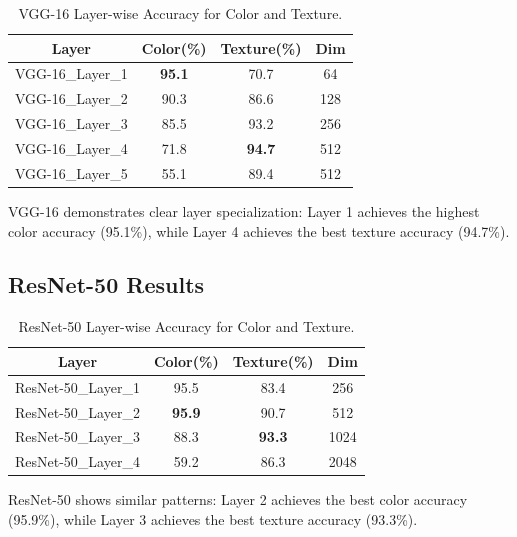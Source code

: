 \documentclass[conference]{IEEEtran}
\begin{document}
\begin{table}[htbp]
\caption{VGG-16 Layer-wise Accuracy for Color and Texture.}
\begin{center}
\begin{tabular}{|c|c|c|c|}
\hline
\textbf{Layer} & \textbf{Color(\%)} & \textbf{Texture(\%)} & \textbf{Dim}\\
\hline
VGG-16\_Layer\_1 & \textbf{95.1} & 70.7 & 64 \\
\hline
VGG-16\_Layer\_2 & 90.3 & 86.6 & 128 \\
\hline
VGG-16\_Layer\_3 & 85.5 & 93.2 & 256 \\
\hline
VGG-16\_Layer\_4 & 71.8 & \textbf{94.7} & 512 \\
\hline
VGG-16\_Layer\_5 & 55.1 & 89.4 & 512 \\
\hline
\end{tabular}
\label{tab1}
\end{center}
\end{table}

VGG-16 demonstrates clear layer specialization: Layer 1 achieves the highest color accuracy (95.1\%), while Layer 4 achieves the best texture accuracy (94.7\%).

\subsection{ResNet-50 Results}

\begin{table}[htbp]
\caption{ResNet-50 Layer-wise Accuracy for Color and Texture.}
\begin{center}
\begin{tabular}{|c|c|c|c|}
\hline
\textbf{Layer} & \textbf{Color(\%)} & \textbf{Texture(\%)} & \textbf{Dim}\\
\hline
ResNet-50\_Layer\_1 & 95.5 & 83.4 & 256 \\
\hline
ResNet-50\_Layer\_2 & \textbf{95.9} & 90.7 & 512 \\
\hline
ResNet-50\_Layer\_3 & 88.3 & \textbf{93.3} & 1024 \\
\hline
ResNet-50\_Layer\_4 & 59.2 & 86.3 & 2048 \\
\hline
\end{tabular}
\label{tab2}
\end{center}
\end{table}

ResNet-50 shows similar patterns: Layer 2 achieves the best color accuracy (95.9\%), while Layer 3 achieves the best texture accuracy (93.3\%).
\end{document}
